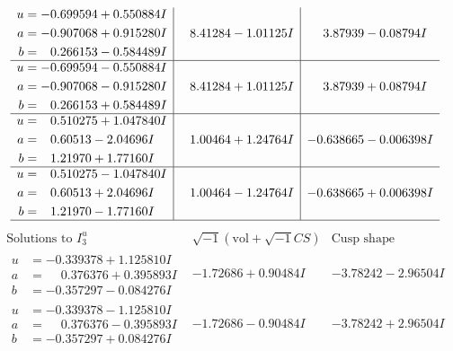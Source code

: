 \documentclass[1p]{elsarticle_modified}
\theoremstyle{definition}
\newcommand{\I}{\sqrt{-1}}
\begin{document}
$$\begin{array}{c|c|c}
\begin{aligned}
u &= -0.699594 + 0.550884 I \\
a &= -0.907068 + 0.915280 I \\
b &= \phantom{-}0.266153 - 0.584489 I\end{aligned}
 & \phantom{-}8.41284 - 1.01125 I & \phantom{-}3.87939 - 0.08794 I \\ \hline\begin{aligned}
u &= -0.699594 - 0.550884 I \\
a &= -0.907068 - 0.915280 I \\
b &= \phantom{-}0.266153 + 0.584489 I\end{aligned}
 & \phantom{-}8.41284 + 1.01125 I & \phantom{-}3.87939 + 0.08794 I \\ \hline\begin{aligned}
u &= \phantom{-}0.510275 + 1.047840 I \\
a &= \phantom{-}0.60513 - 2.04696 I \\
b &= \phantom{-}1.21970 + 1.77160 I\end{aligned}
 & \phantom{-}1.00464 + 1.24764 I & -0.638665 - 0.006398 I \\ \hline\begin{aligned}
u &= \phantom{-}0.510275 - 1.047840 I \\
a &= \phantom{-}0.60513 + 2.04696 I \\
b &= \phantom{-}1.21970 - 1.77160 I\end{aligned}
 & \phantom{-}1.00464 - 1.24764 I & -0.638665 + 0.006398 I\\
 \hline 
 \end{array}$$\newpage$$\begin{array}{c|c|c}  
\text{Solutions to }I^u_{3}& \I (\text{vol} + \sqrt{-1}CS) & \text{Cusp shape}\\
 \hline 
\begin{aligned}
u &= -0.339378 + 1.125810 I \\
a &= \phantom{-}0.376376 + 0.395893 I \\
b &= -0.357297 - 0.084276 I\end{aligned}
 & -1.72686 + 0.90484 I & -3.78242 - 2.96504 I \\ \hline\begin{aligned}
u &= -0.339378 - 1.125810 I \\
a &= \phantom{-}0.376376 - 0.395893 I \\
b &= -0.357297 + 0.084276 I\end{aligned}
 & -1.72686 - 0.90484 I & -3.78242 + 2.96504 I \\ \hline\begin{aligned}

\end{aligned}
\end{array}$$
\end{document}
